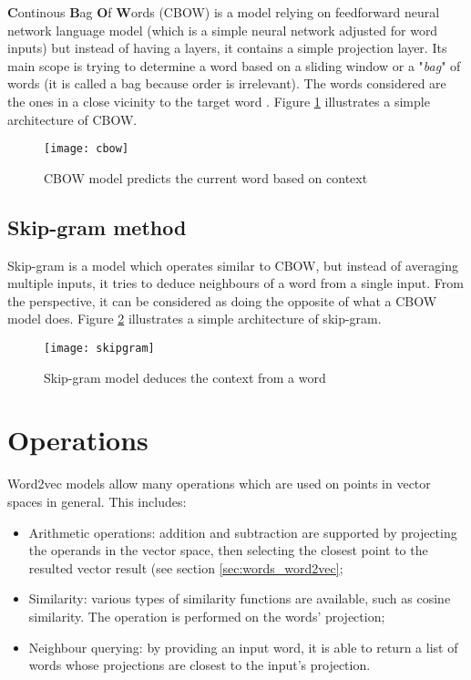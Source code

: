 \textbf{C}ontinous \textbf{B}ag \textbf{O}f \textbf{W}ords (CBOW) is a model relying on feedforward neural network language model (which is a simple neural network adjusted for word inputs) but instead of having a layers, it contains a simple projection layer. Its main scope is trying to determine a word based on a sliding window or a "\textit{bag}" of words (it is called a bag because order is irrelevant). The words considered are the ones in a close vicinity to the target word \cite{word2vec}. Figure \ref{fig:cbow} illustrates a simple architecture of CBOW.

\begin{figure}[b!]
\centering
\texttt{[image: cbow]}
\caption{CBOW model predicts the current word based on context}
\label{fig:cbow}
\end{figure}

\subsection{Skip-gram method}
\label{subsec:words_creation_skipgram}

Skip-gram is a model which operates similar to CBOW, but instead of averaging multiple inputs, it tries to deduce neighbours of a word from a single input. From the perspective, it can be considered as doing the opposite of what a CBOW model does. Figure \ref{fig:skipgram} illustrates a simple architecture of skip-gram.

\begin{figure}[b!]
\centering
\texttt{[image: skipgram]}
\caption{Skip-gram model deduces the context from a word}
\label{fig:skipgram}
\end{figure}

\section{Operations}
\label{sec:words_operations}

Word2vec models allow many operations which are used on points in vector spaces in general. This includes:

\begin{itemize}
\item{Arithmetic operations: addition and subtraction are supported by projecting the operands in the vector space, then selecting the closest point to the resulted vector result (see section \ref{sec:words_word2vec};}
\item{Similarity: various types of similarity functions are available, such as cosine similarity. The operation is performed on the words' projection;}
\item{Neighbour querying: by providing an input word, it is able to return a list of words whose projections are closest to the input's projection.}
\end{itemize}




